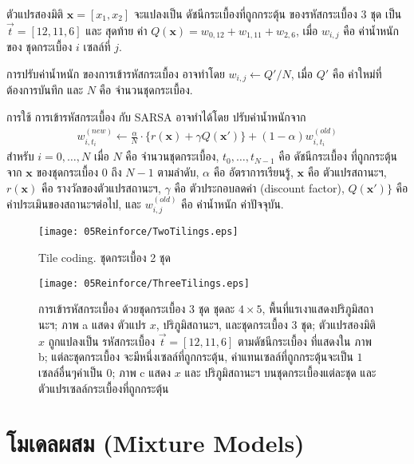 ตัวแปรสองมิติ $\textbf{x} = [x_1, x_2]$ จะแปลงเป็น ดัชนีกระเบื้องที่ถูกกระตุ้น ของรหัสกระเบื้อง 3 ชุด เป็น $\vec{t} = [12, 11, 6]$ และ สุดท้าย ค่า $Q(\textbf{x}) = w_{0,12} + w_{1,11} + w_{2, 6}$, เมื่อ $w_{i,j}$ คือ ค่าน้ำหนักของ ชุดกระเบื้อง $i$ เซลล์ที่ $j$.

การปรับค่าน้ำหนัก ของการเข้ารหัสกระเบื้อง อาจทำโดย $w_{i,j} \gets Q'/N$, เมื่อ $Q'$ คือ ค่าใหม่ที่ต้องการบันทึก และ $N$ คือ จำนวนชุดกระเบื้อง.

การใช้ การเข้ารหัสกระเบื้อง กับ SARSA อาจทำได้โดย ปรับค่าน้ำหนักจาก
%
\begin{eqnarray}
w_{i,t_i}^{(new)} \gets \frac{\alpha}{N} \cdot \{r(\textbf{x}) + \gamma Q(\textbf{x}')\} + (1 - \alpha) w_{i,t_i}^{(old)}
\label{eq: SARSA tile coding update w}
\end{eqnarray}
สำหรับ $i = 0, \ldots, N$ 
เมื่อ 
$N$ คือ จำนวนชุดกระเบื้อง,
$t_0, \ldots, t_{N-1}$ คือ ดัชนีกระเบื้อง ที่ถูกกระตุ้น จาก $\textbf{x}$ ของชุดกระเบื้อง $0$ ถึง $N-1$ ตามลำดับ,
$\alpha$ คือ อัตราการเรียนรู้,
$\textbf{x}$ คือ ตัวแปรสถานะฯ,
$r(\textbf{x})$ คือ รางวัลของตัวแปรสถานะฯ,
$\gamma$ คือ ตัวประกอบลดค่า (discount factor), 
$Q(\textbf{x}')\}$ คือ ค่าประเมินของสถานะฯต่อไป, และ
$w_{i,j}^{(old)}$ คือ ค่าน้ำหนัก ค่าปัจจุบัน.

%
\begin{figure}
\begin{center}
\texttt{[image: 05Reinforce/TwoTilings.eps]}
\end{center}
\caption{Tile coding. ชุดกระเบื้อง 2 ชุด}
\label{fig: two tilings}
\end{figure}

%
\begin{figure}
\begin{center}
\texttt{[image: 05Reinforce/ThreeTilings.eps]}
\end{center}
\caption{การเข้ารหัสกระเบื้อง ด้วยชุดกระเบื้อง 3 ชุด ชุดละ $4 \times 5$, พื้นที่แรเงาแสดงปริภูมิสถานะฯ; ภาพ a แสดง ตัวแปร $x$, ปริภูมิสถานะฯ, และชุดกระเบื้อง 3 ชุด; ตัวแปรสองมิติ $x$ ถูกแปลงเป็น รหัสกระเบื้อง $\vec{t} = [12, 11, 6]$ ตามดัชนีกระเบื้อง ที่แสดงใน ภาพ b; แต่ละชุดกระเบื้อง จะมีหนึ่งเซลล์ที่ถูกกระตุ้น, 
ค่าแทนเซลล์ที่ถูกกระตุ้นจะเป็น $1$ เซลล์อื่นๆค่าเป็น $0$; ภาพ c แสดง $x$ และ ปริภูมิสถานะฯ บนชุดกระเบื้องแต่ละชุด และ ตัวแปรเซลล์กระเบื้องที่ถูกกระตุ้น}
\label{fig: three tilings}
\end{figure}

\section{โมเดลผสม (Mixture Models)}

